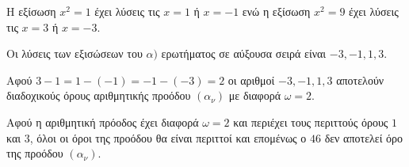 
\begin{alist}
\item Η εξίσωση $x^2 = 1$ έχει λύσεις τις $x = 1$ ή $x = -1$ ενώ η εξίσωση $x^2 = 9$ έχει λύσεις τις
$x = 3$ ή $x = -3$.

\item Οι λύσεις των εξισώσεων του $\alpha)$ ερωτήματος σε αύξουσα σειρά είναι $-3, -1, 1, 3$.
\begin{rlist}
\item Αφού $3 - 1 = 1 - (-1) = -1 - (-3) = 2$ οι αριθμοί $-3, -1, 1, 3$ αποτελούν διαδοχικούς
όρους αριθμητικής προόδου $(\alpha_\nu)$ με διαφορά $\omega = 2$.
\item Αφού η αριθμητική πρόοδος έχει διαφορά $\omega = 2$ και περιέχει τους περιττούς όρους $1$
και $3$, όλοι οι όροι της προόδου θα είναι περιττοί και επομένως ο $46$ δεν αποτελεί όρο
της προόδου $(\alpha_\nu)$.
\end{rlist}
\end{alist}

